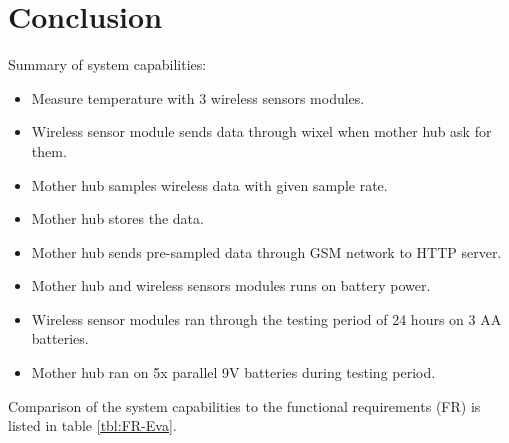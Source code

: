 \section*{Conclusion}
Summary of system capabilities:
\begin{itemize}
	\item Measure temperature with 3 wireless sensors modules.
	\item Wireless sensor module sends data through wixel when mother hub ask for them.
	\item Mother hub samples wireless data with given sample rate.
	\item Mother hub stores the data.
	\item Mother hub sends pre-sampled data through GSM network to HTTP server.
	\item Mother hub and wireless sensors modules runs on battery power.
	\item Wireless sensor modules ran through the testing period of 24 hours on 3 AA batteries.
	\item Mother hub ran on 5x parallel 9V batteries during testing period.
\end{itemize}
 
Comparison of the system capabilities to the functional requirements (FR) is listed in table \ref{tbl:FR-Eva}.
 
